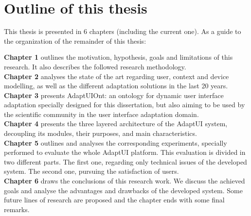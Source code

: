 
\section{Outline of this thesis}
\label{sec:outline}

This thesis is presented in 6 chapters (including the current one). As a guide 
to the organization of the remainder of this thesis:

\hspace*{5mm} \textbf{Chapter 1} outlines the motivation, hypothesis, goals and 
limitations of this research. It also describes the followed research 
methodology. \\

\hspace*{5mm} \textbf{Chapter 2} analyses the state of the art regarding user, 
context and device modelling, as well as the different adaptation solutions in 
the last 20 years. \\

\hspace*{5mm} \textbf{Chapter 3} presents AdaptUIOnt: an ontology for 
dynamic user interface adaptation specially designed for this dissertation, 
but also aiming to be used by the scientific community in the user interface 
adaptation domain.\\

\hspace*{5mm} \textbf{Chapter 4} presents the three layered architecture of 
the AdaptUI system, decoupling its modules, their purposes, and main 
characteristics.\\

\hspace*{5mm} \textbf{Chapter 5} outlines and analyses the corresponding
experiments, specially performed to evaluate the whole AdaptUI platform. This
evaluation is divided in two different parts. The first one, regarding only
technical issues of the developed system. The second one, pursuing the 
satisfaction of users.\\

\hspace*{5mm} \textbf{Chapter 6} draws the conclusions of this research work. We 
discuss the achieved goals and analyse the advantages and drawbacks of the 
developed system. Some future lines of research are proposed and the chapter 
ends with some final remarks.\\


% 
